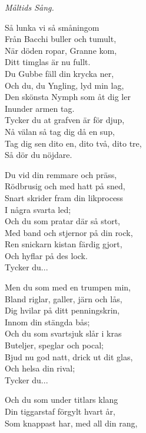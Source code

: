 {\footnotesize\textit{Måltids Sång.}}\par
\vspace{10pt}
Så lunka vi så småningom\\
Från Bacchi buller och tumult,\\
När döden ropar, Granne kom,\\
Ditt timglas är nu fullt.\\
Du Gubbe fäll din krycka ner,\\
Och du, du Yngling, lyd min lag,\\
Den skönsta Nymph som åt dig ler\\
Inunder armen tag.\\
Tycker du at grafven är för djup,\\
Nå välan så tag dig då en sup,\\
Tag dig sen dito en, dito två, dito tre,\\
Så dör du nöjdare.\par
\vspace{10pt}
Du vid din remmare och präss,\\
Rödbrusig och med hatt på sned,\\
Snart skrider fram din likprocess\\
I några svarta led;\\
Och du som pratar där så stort,\\
Med band och stjernor på din rock,\\
Ren snickarn kistan färdig gjort,\\
Och hyflar på des lock.\\
Tycker du...\par
\newpage
Men du som med en trumpen min,\\
Bland riglar, galler, järn och lås,\\
Dig hvilar på ditt penningskrin,\\
Innom din stängda bås;\\
Och du som svartsjuk slår i kras\\
Buteljer, speglar och pocal;\\
Bjud nu god natt, drick ut dit glas,\\
Och helsa din rival;\\
Tycker du...\par
\vspace{10pt}
Och du som under titlars klang\\
Din tiggarstaf förgylt hvart år,\\
Som knappast har, med all din rang,\\

